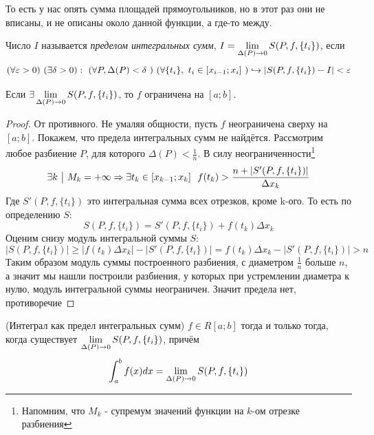 \begin{note}
	То есть у нас опять сумма площадей прямоугольников, но в этот раз они не вписаны, и не описаны около данной функции, а где-то между.
\end{note}

\begin{definition}
	Число $I$ называется \textit{пределом интегральных сумм}, $I = \lim\limits_{\Delta(P) \to 0}S(P, f, \{t_i\})$, если
	\[
		(\forall \varepsilon > 0)\ (\exists \delta > 0): \ (\forall P, \Delta(P) < \delta\ ) \ ( \forall \{t_i\},\ t_i \in [x_{i - 1}; x_i]\  )\hookrightarrow |S(P, f, \{t_i\}) - I| < \varepsilon
	\]
\end{definition}

\begin{lemma}
	Если $\exists \lim\limits_{\Delta(P) \to 0} S(P, f, \{t_i\})$, то $f$ ограничена на $[a; b]$.
\end{lemma}

\begin{proof}
	От противного. Не умаляя общности, пусть $f$ неограничена сверху на $[a; b]$. Покажем, что предела интегральных сумм не найдётся. Рассмотрим любое разбиение $P$, для которого $\Delta(P) < \frac{1}{n}$. В силу неограниченности\footnote{Напомним, что $M_k$ - супремум значений функции на $k$-ом отрезке разбиения}
	\[
		\exists k \ \big|\  M_k = +\infty \Rightarrow \exists t_k \in [x_{k - 1}; x_k]\ \ f(t_k) > \frac{n + |S'(P, f, \{t_i\})|}{\Delta x_k}
	\]
	Где  $S'(P, f, \{t_i\})$ это интегральная сумма всех отрезков, кроме k-ого. То есть по определению $S$:
	\[
		S(P, f, \{t_i\}) = S'(P, f, \{t_i\}) + f(t_k) \Delta x_k
	\]
	Оценим снизу модуль интегральной суммы $S$:
	\[
		|S(P, f, \{t_i\})| \ge |f(t_k) \Delta x_k| - |S'(P, f, \{t_i\})| = f(t_k)\Delta x_k - |S'(P, f, \{t_i\})| > n
	\]
	Таким образом модуль суммы построенного разбиения, с диаметром $\frac{1}{n}$ больше  $n$, а значит мы нашли построили разбиения, у которых при устремлении диаметра к нулю, модуль интегральной суммы неограничен. Значит предела нет, противоречие
\end{proof}

\begin{theorem} (Интеграл как предел интегральных сумм)
	$f \in R[a; b]$ тогда и только тогда, когда существует $\lim\limits_{\Delta(P) \to 0} S(P, f, \{t_i\})$, причём
	\[
		\int_a^b f(x)dx = \lim\limits_{\Delta(P) \to 0} S(P, f, \{t_i\})
	\]
\end{theorem}

